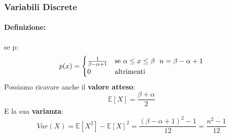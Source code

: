 \documentclass[]{article}
\newcommand{\ev}{\mathbb{E}[X]}
\renewcommand{\ev}[1]{\mathbb{E}[#1]}
\newcommand{\definizione}{\paragraph{Definizione:}}
\begin{document}
    \subsubsection{Variabili Discrete}
    \definizione se p:
    \begin{equation*}
        p(x) =
        \begin{cases}
            \frac{1}{\beta - \alpha + 1} & \text{se } \alpha \leq x \leq \beta \text{ \space} n = \beta - \alpha + 1 \\
            0 & \text{altrimenti}
        \end{cases}
    \end{equation*}
    Possiamo ricavare anche il \textbf{valore atteso}:
    \[ \ev{X} = \frac{\beta + \alpha}{2}\]
    E la sua \textbf{varianza}:
    \[ Var(X) = \ev{X^2} - \ev{X}^2 = \frac{(\beta - \alpha + 1)^2 - 1}{12} = \frac{n^2 - 1}{12}\]

    \newpage
\end{document}
